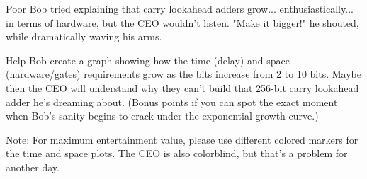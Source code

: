 \documentclass[12pt]{betterjournal}
\begin{document}
Poor Bob tried explaining that carry lookahead adders grow... enthusiastically... in terms of hardware, but the CEO wouldn't listen. "Make it bigger!" he shouted, while dramatically waving his arms.

Help Bob create a graph showing how the time (delay) and space (hardware/gates) requirements grow as the bits increase from 2 to 10 bits. Maybe then the CEO will understand why they can't build that 256-bit carry lookahead adder he's dreaming about. (Bonus points if you can spot the exact moment when Bob's sanity begins to crack under the exponential growth curve.)

Note: For maximum entertainment value, please use different colored markers for the time and space plots. The CEO is also colorblind, but that's a problem for another day.
\end{document}
